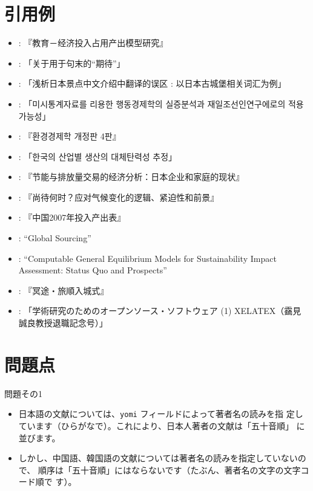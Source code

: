 \documentclass{ltjsarticle}
\begin{document}
\section{引用例}
\begin{itemize}
 \item \citet{zhang_IO_2009}: 『教育－经济投入占用产出模型研究』
 \item \citet{40022221997}: 「关于用于句末的``期待''」
 \item \citet{40022198771}: 「浅析日本景点中文介绍中翻译的误区 : 以日本古城堡相关词汇为例」
 \item \citet{40022308104}: 「미시통계자료를 리용한 행동경제학의 실증분석과 재일조선인연구에로의 적용가능성」
 \item \citet{gwon-osang-env-econ-2020}: 『환경경제학 개정판 4판』
 \item \citet{Seong-Tae_Kim_2011}: 「한국의 산업별 생산의 대체탄력성 추정」
 \item \citet{arimura-takeda-energy-2017}: 『节能与排放量交易的经济分析：日本企业和家庭的现状』
 \item \citet{Stern_2016:chn}: 『尚待何时？应对气候变化的逻辑、紧迫性和前景』
 \item \citet{china-io-2007}: 『中国2007年投入产出表』
 \item \citet{Stokey2004}: ``Global Sourcing''
 \item \citet{Bohringer2006}: ``Computable General Equilibrium Models for
       Sustainability Impact Assessment: Status Quo and Prospects''
 \item \citet{内田90}: 『冥途・旅順入城式』
 \item \citet{120005614155}: 「学術研究のためのオープンソース・ソフトウェア (1)
       XELATEX（靎見誠良教授退職記念号）」
\end{itemize}

\section{問題点}

問題その1
\begin{itemize}
 \item 日本語の文献については、\texttt{yomi} フィールドによって著者名の読みを指
       定しています（ひらがなで）。これにより、日本人著者の文献は「五十音順」
       に並びます。
 \item しかし、中国語、韓国語の文献については著者名の読みを指定していないので、
       順序は「五十音順」にはならないです（たぶん、著者名の文字の文字コード順で
       す）。
\end{itemize}
\end{document}
